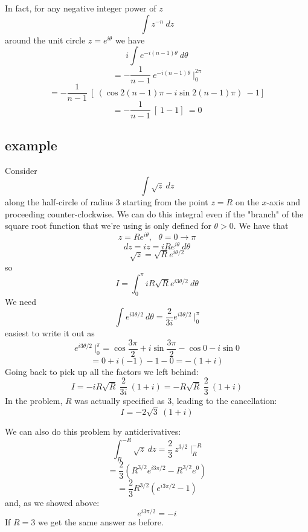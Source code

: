 \documentclass[11pt, oneside]{article}   	%
\begin{document}
In fact, for any negative integer power of $z$
\[ \int z^{-n} \ dz \]
around the unit circle $z=e^{i\theta}$ we have
\[ i \int e^{-i(n-1)\theta} \ d \theta \]
\[ = -\frac{1}{n-1} \ e^{-i(n-1)\theta} \ \bigg |_0^{2 \pi}  \]
\[ = -\frac{1}{n-1} \ [ \ (\cos 2 (n-1) \pi - i \sin 2 (n-1) \pi ) \ - 1 ]   \]
\[ = -\frac{1}{n-1} \ [ \ 1  - 1 ] \ = 0  \]

\subsection*{example}
Consider
\[ \int \sqrt{z} \ dz \]
along the half-circle of radius $3$ starting from the point $z = R$ on the $x$-axis and proceeding counter-clockwise.
We can do this integral even if the "branch" of the square root function that we're using is only defined for $\theta > 0$.  We have that 
\[ z = Re^{i\theta}, \ \ \ \theta = 0 \rightarrow \pi \]
\[ dz = iz = iRe^{i\theta} \ d \theta \]
\[ \sqrt{z} = \sqrt{R} e^{i\theta/2} \]
so
\[ I = \int_0^{\pi} iR \sqrt{R} e^{i3\theta/2} \ d \theta \]
We need
\[ \int e^{i3\theta/2} \ d \theta = \frac{2}{3i} e^{i3\theta/2} \ \bigg |_0^{\pi} \]
easiest to write it out as
\[ e^{i3\theta/2} \ \bigg |_0^{\pi} = \cos \frac{3\pi}{2} + i \sin  \frac{3\pi}{2} - \cos 0 - i \sin 0 \]
\[ = 0 + i(-1) - 1 - 0 = -(1+i) \]
Going back to pick up all the factors we left behind:
\[ I = -iR \sqrt{R} \ \frac{2}{3i} \ (1+i) = -R \sqrt{R} \ \frac{2}{3} \ (1+i) \]
In the problem, $R$ was actually specified as $3$, leading to the cancellation:
\[ I = - 2 \sqrt{3} \ (1+i) \]

We can also do this problem by antiderivatives:
\[ \int_R^{-R} \sqrt{z} \ dz = \frac{2}{3} \ z^{3/2} \ \bigg |_R^{-R}  \]
\[ = \frac{2}{3} ( R^{3/2} e^{i3\pi/2} - R^{3/2} e^0) \]
\[ = \frac{2}{3} R^{3/2} ( e^{i3\pi/2} - 1) \]
and, as we showed above:
\[ e^{i3\pi/2} = -i \]
If $R=3$ we get the same answer as before.
\end{document}
